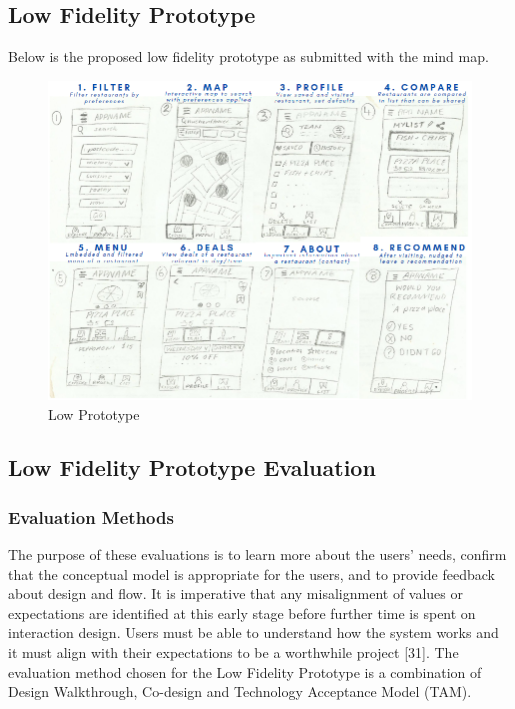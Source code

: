 \documentclass[a4 paper, 12pt]{article}
\begin{document}
    \subsection{Low Fidelity Prototype}
    Below is the proposed low fidelity prototype as submitted with the mind map. 
    \begin{figure} [H]
        \centering
        \includegraphics[width=\textwidth, frame]
            {./Low_Fidelity/Low_Report/low_proto_notes.PNG} 
        \caption{Low Prototype}
    \end{figure}  
    
    
\subsection{Low Fidelity Prototype Evaluation}

\subsubsection{Evaluation Methods}
The purpose of these evaluations is to learn more about the users' needs, confirm that the conceptual model is appropriate for the users, and to provide feedback about design and flow. It is imperative that any misalignment of values or expectations are identified at this early stage before further time is spent on interaction design. Users must be able to understand how the system works and it must align with their expectations to be a worthwhile project [31]. The evaluation method chosen for the Low Fidelity Prototype is a combination of Design Walkthrough, Co-design and Technology Acceptance Model (TAM).
\end{document}
